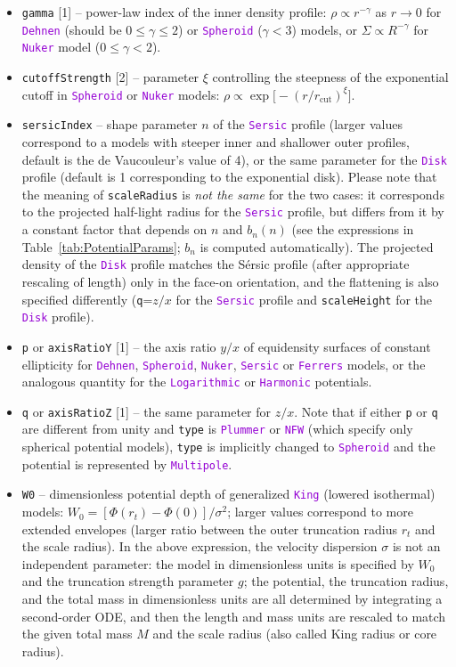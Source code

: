 \documentclass[12pt]{article}
\newcommand{\ttt}[1]{\textcolor{darkviolet}{\texttt{#1}}}
\newcommand{\ppp}[1]{\textcolor{darkolive} {\texttt{#1}}}
\begin{document}
\begin{itemize}
\item \ppp{gamma} [1] -- power-law index of the inner density profile: $\rho \propto r^{-\gamma}$ as $r\to 0$ for \ttt{Dehnen} (should be $0\le\gamma\le 2$) or \ttt{Spheroid} ($\gamma<3$) models, or $\Sigma \propto R^{-\gamma}$ for \ttt{Nuker} model ($0\le \gamma < 2$).
\item \ppp{cutoffStrength} [2] -- parameter $\xi$ controlling the steepness of the exponential cutoff in \ttt{Spheroid} or \ttt{Nuker} models: $\rho \propto \exp\big[-(r/r_\mathrm{cut})^\xi\big]$.
\item \ppp{sersicIndex} -- shape parameter $n$ of the \ttt{Sersic} profile (larger values correspond to a models with steeper inner and shallower outer profiles, default is the de Vaucouleur's value of 4), or the same parameter for the \ttt{Disk} profile (default is 1 corresponding to the exponential disk). Please note that the meaning of \ppp{scaleRadius} is \textit{not the same} for the two cases: it corresponds to the projected half-light radius for the \ttt{Sersic} profile, but differs from it by a constant factor that depends on $n$ and $b_n(n)$ (see the expressions in Table~\ref{tab:PotentialParams}; $b_n$ is computed automatically). The projected density of the \ttt{Disk} profile matches the S\'ersic profile (after appropriate rescaling of length) only in the face-on orientation, and the flattening is also specified differently (\ppp{q}=$z/x$ for the \ttt{Sersic} profile and \ppp{scaleHeight} for the \ttt{Disk} profile).
\item \ppp{p} or \ppp{axisRatioY} [1] -- the axis ratio $y/x$ of equidensity surfaces of constant ellipticity for \ttt{Dehnen}, \ttt{Spheroid}, \ttt{Nuker}, \ttt{Sersic} or \ttt{Ferrers} models, or the analogous quantity for the \ttt{Logarithmic} or \ttt{Harmonic} potentials.
\item \ppp{q} or \ppp{axisRatioZ} [1] -- the same parameter for $z/x$. Note that if either \ppp{p} or \ppp{q} are different from unity and \ppp{type} is \ttt{Plummer} or \ttt{NFW} (which specify only spherical potential models), \ppp{type} is implicitly changed to \ttt{Spheroid} and the potential is represented by \ttt{Multipole}.
\item \ppp{W0} -- dimensionless potential depth of generalized \ttt{King} (lowered isothermal) models: $W_0 = [ \Phi(r_t) - \Phi(0) ] / \sigma^2$; larger values correspond to more extended envelopes (larger ratio between the outer truncation radius $r_t$ and the scale radius). In the above expression, the velocity dispersion $\sigma$ is not an independent parameter: the model in dimensionless units is specified by $W_0$ and the truncation strength parameter $g$; the potential, the truncation radius, and the total mass in dimensionless units are all determined by integrating a second-order ODE, and then the length and mass units are rescaled to match the given total mass $M$ and the scale radius (also called King radius or core radius).

\end{itemize}
\end{document}
